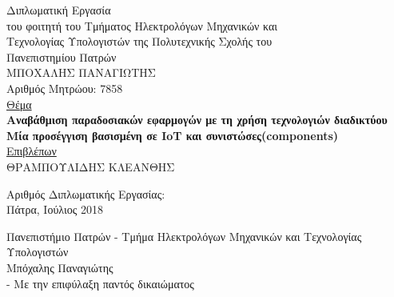 \begin{titlepage}
\vspace*{0.7cm} 

\begin{center}
	{\LARGE Διπλωματική Εργασία} \\
	{\Large του φοιτητή του Τμήματος Ηλεκτρολόγων Μηχανικών και \\
	Τεχνολογίας Υπολογιστών της Πολυτεχνικής Σχολής του \\[0.1cm]
	Πανεπιστημίου Πατρών} \\ [1.3cm]
	


	{\Large ΜΠΟΧΑΛΗΣ ΠΑΝΑΓΙΩΤΗΣ   \\ [0.1cm]
			Αριθμός Μητρώου: 7858 } \\ [1.3cm]


    \Large \underline{Θέμα} \\[0.2cm]
	{ \LARGE \bfseries  Αναβάθμιση παραδοσιακών εφαρμογών με τη χρήση τεχνολογιών διαδικτύου}  \\
	{ \Large \bfseries Μία προσέγγιση βασισμένη σε IoT και συνιστώσες(components)} \\[1cm] 

	\Large \underline{Επιβλέπων} \\[0.2cm]
	{ \Large    ΘΡΑΜΠΟΥΛΙΔΗΣ ΚΛΕΑΝΘΗΣ} \\

\vspace*{1.3cm} 




Αριθμός Διπλωματικής Εργασίας: \\[0.6cm] 
 

Πάτρα, Ιούλιος 2018 
\end{center}





\vfill %

\end{titlepage}

\newpage 

\thispagestyle{empty} 

\vspace*{20cm}
Πανεπιστήμιο Πατρών - Τμήμα Ηλεκτρολόγων Μηχανικών και Τεχνολογίας Υπολογιστών\\ 
Μπόχαλης Παναγιώτης\\
  
 - Με την επιφύλαξη παντός δικαιώματος